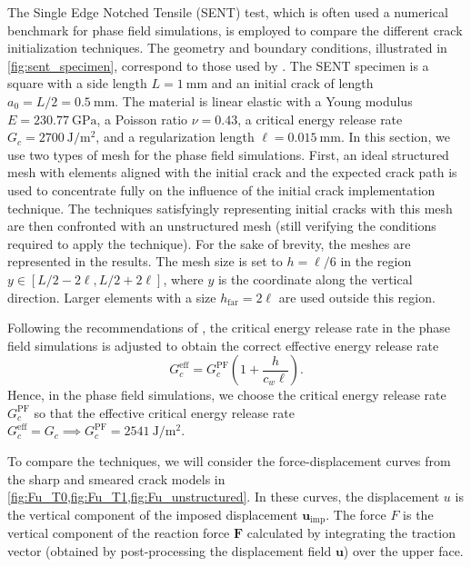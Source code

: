 \documentclass[OptSoft]{jtcam_preprint}
\newcommand{\uu}{\bm{u}}
\newcommand{\uimp}{\uu_{\mathrm{imp}}}
\begin{document}
The Single Edge Notched Tensile (SENT) test, which is often used a numerical benchmark for phase field simulations,  is employed to compare the different crack initialization techniques.
The geometry and boundary conditions, illustrated in \cref{fig:sent_specimen}, correspond to those used by \textcite{singh_fracture-controlled_2016}.
The SENT specimen is a square with a side length $L = \qty{1}{\milli\meter}$ and an initial crack of length $a_0 = L/2 = \qty{0.5}{\milli\meter}$.
The material is linear elastic with a Young modulus $E=\qty{230.77}{\giga\pascal}$, a Poisson ratio $\nu=0.43$, a critical energy release rate $G_c=\qty{2 700}{\joule\per\square\meter}$, and a regularization length $\ell=\qty{0.015}{\milli\meter}$.
In this section, we use two types of mesh for the phase field simulations.
First, an ideal structured mesh with elements aligned with the initial crack and the expected crack path is used to concentrate fully on the influence of the initial crack implementation technique.
The techniques satisfyingly representing initial cracks with this mesh are then confronted with an unstructured mesh (still verifying the conditions required to apply the technique).
For the sake of brevity, the meshes are represented in the results.
The mesh size is set to $h=\ell/6$ in the region $y \in [L/2 - 2 \ell, L/2 + 2 \ell]$, where $y$ is the coordinate along the vertical direction.
Larger elements with a size $h_{\mathrm{far}} = 2 \ell$ are used outside this region.

Following the recommendations of \textcite{bourdin_variational_2008}, the critical energy release rate in the phase field simulations is adjusted to obtain the correct effective energy release rate 
\begin{equation}
    G_c^{\mathrm{eff}} = G_c^{\mathrm{PF}} \left( 1 + \frac{h}{c_w \ell} \right).
\end{equation}
Hence, in the phase field simulations, we choose the critical energy release rate $G_c^{\mathrm{PF}}$ so that the effective critical energy release rate $G_c^{\mathrm{eff}} = G_c \implies G_c^{\mathrm{PF}} = \qty{2541}{\joule\per\square\meter}$.

To compare the techniques, we will consider the force-displacement curves from the sharp and smeared crack models in \cref{fig:Fu_T0,fig:Fu_T1,fig:Fu_unstructured}.
In these curves, the displacement $u$ is the vertical component of the imposed displacement $\uimp$.
The force $F$ is the vertical component of the reaction force $\bm{F}$ calculated by integrating the traction vector (obtained by post-processing the displacement field $\uu$) over the upper face.
\end{document}
